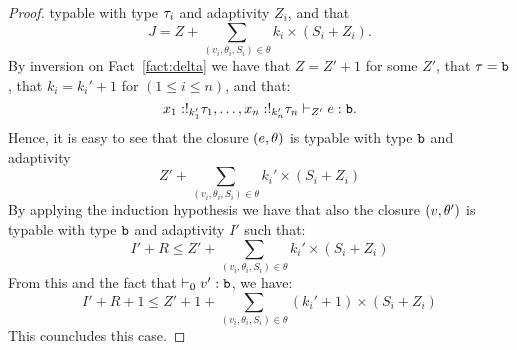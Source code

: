 \begin{proof}
    typable with type $\tau_i$ and adaptivity $Z_i$, and that 
$$J = Z + \sum_{(v_i,\theta_i,S_i)\in\theta} k_i \times (S_i
  +Z_i).$$
By inversion on Fact~\ref{fact:delta} we have that $Z=Z'+1$ for some
$Z'$, that $\tau=\mathtt{b}$, that $k_i= k_i'+1$ for $(1\leq i\leq n)$,
and that:
     \begin{equation}
\label{fact:delta}
       x_1 : !_{k_1'} \tau_1, \ldots, x_n:!_{k_n'} \tau_n
\vdash_{Z'} e : \mathtt{b}.
\end{equation}
Hence, it is easy to see that the closure
$(e, \theta)$
is typable with type $\mathtt{b}$ and adaptivity 
$$Z' + \sum_{(v_i,\theta_i,S_i)\in\theta} k_i' \times (S_i
  +Z_i)$$
By applying the induction hypothesis we have that also 
the closure 
$(v, \theta')$ is typable with type $\mathtt{b}$ and adaptivity $I'$ such
that:
$$
I'+R\leq Z' + \sum_{(v_i,\theta_i,S_i)\in\theta} k_i' \times (S_i
  +Z_i)
$$
From this and the fact that $\vdash_0 v' :\mathtt{b}$, we have:
$$
I'+R+1\leq Z'+1 + \sum_{(v_i,\theta_i,S_i)\in\theta} (k_i'+1) \times (S_i
  +Z_i)
$$
This councludes this case. 
   \end{proof}  